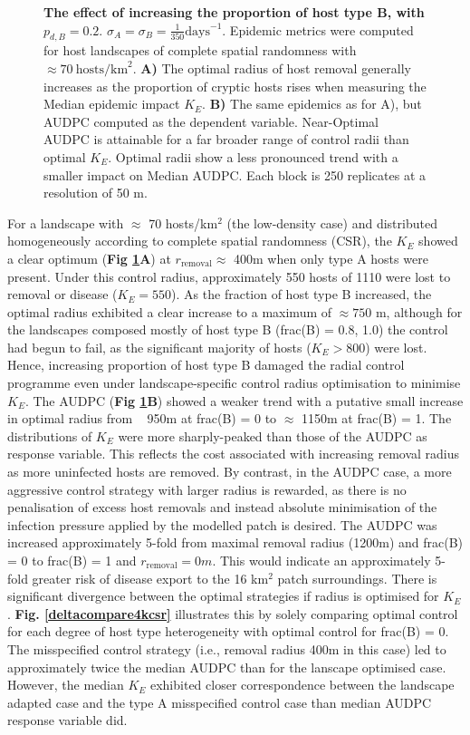 \documentclass[11pt,letterpaper]{article}
\begin{document}
\begin{figure}[h]
	\centering
	
	\caption{\label{csr4kdeltapd} \textbf{The effect of increasing the proportion of host type B, with $p_{d,B}  = 0.2$}. $\sigma_{A} = \sigma_{B} = \frac{1}{350}  \mathrm{days}^{-1}$. Epidemic metrics were computed for host landscapes of complete spatial randomness with $\approx 70 \: \mathrm{ hosts} / \mathrm{km}^2$. \textbf{A)} The optimal radius of host removal generally increases as the proportion of cryptic hosts rises when measuring the Median epidemic impact $K_E$. \textbf{B)} The same epidemics as for A), but AUDPC computed as the dependent variable. Near-Optimal AUDPC is attainable for a far broader range of control radii than optimal $K_E$.  
		Optimal radii show a less pronounced trend with a smaller impact on Median AUDPC. Each block is 250 replicates at a resolution of 50 m.}
\end{figure}

For a landscape with $\approx$ 70 hosts/km$^{2}$ (the low-density case) and distributed homogeneously according to complete spatial randomness (CSR), the $K_E$ showed a clear optimum (\textbf{Fig \ref{csr4kdeltapd}A}) at $r_{\mathrm{removal}} \approx$ 400m when only type A hosts were present. Under this control radius, approximately 550 hosts of 1110 were lost to removal or disease ($K_E = 550$). As the fraction of host type B increased, the optimal radius exhibited a clear increase to a maximum of $\approx 750$ m, although for the landscapes composed mostly of host type B (frac(B) = 0.8, 1.0) the control had begun to fail, as the significant majority of hosts ($K_E > 800$) were lost. Hence, increasing proportion of host type B damaged the radial control programme even under landscape-specific control radius optimisation to minimise $K_E$.  The AUDPC (\textbf{Fig \ref{csr4kdeltapd}B}) showed a weaker trend with a putative small increase in optimal radius from ~ 950m at frac(B) = 0 to $\approx$ 1150m at frac(B) = 1. The distributions of $K_E$ were more sharply-peaked than those of the AUDPC as response variable. This reflects the cost associated with increasing removal radius as more uninfected hosts are removed. By contrast, in the AUDPC case, a more aggressive control strategy with larger radius is rewarded, as there is no penalisation of excess host removals and instead absolute minimisation of the infection pressure applied by the modelled patch is desired. The AUDPC was increased approximately 5-fold from maximal removal radius (1200m) and frac(B) = 0 to frac(B) = 1 and $r_\mathrm{removal} = 0m$. This would indicate an approximately 5-fold greater risk of disease export to the 16 km$^{2}$ patch surroundings. There is significant divergence between the optimal strategies if radius is optimised for $K_E$. \textbf{Fig. \ref{deltacompare4kcsr}} illustrates this by solely comparing optimal control for each degree of host type heterogeneity with optimal control for frac(B) = 0. The misspecified control strategy (i.e., removal radius 400m in this case) led to approximately twice the median AUDPC than for the lanscape optimised case. However, the median $K_E$ exhibited closer correspondence between the landscape adapted case and the type A misspecified control case than median AUDPC response variable did.
\end{document}
